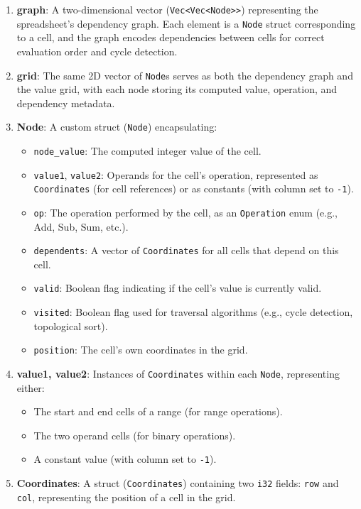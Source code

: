 \documentclass{article}
\begin{document}
\begin{enumerate}
\item \textbf{graph}: A two-dimensional vector (\texttt{Vec<Vec<Node>>}) representing the spreadsheet's dependency graph. Each element is a \texttt{Node} struct corresponding to a cell, and the graph encodes dependencies between cells for correct evaluation order and cycle detection.
\item \textbf{grid}: The same 2D vector of \texttt{Node}s serves as both the dependency graph and the value grid, with each node storing its computed value, operation, and dependency metadata.
\item \textbf{Node}: A custom struct (\texttt{Node}) encapsulating:
\begin{itemize}
\item \texttt{node\_value}: The computed integer value of the cell.
\item \texttt{value1}, \texttt{value2}: Operands for the cell's operation, represented as \texttt{Coordinates} (for cell references) or as constants (with column set to \texttt{-1}).
\item \texttt{op}: The operation performed by the cell, as an \texttt{Operation} enum (e.g., Add, Sub, Sum, etc.).
\item \texttt{dependents}: A vector of \texttt{Coordinates} for all cells that depend on this cell.
\item \texttt{valid}: Boolean flag indicating if the cell's value is currently valid.
\item \texttt{visited}: Boolean flag used for traversal algorithms (e.g., cycle detection, topological sort).
\item \texttt{position}: The cell's own coordinates in the grid.
\end{itemize}
\item \textbf{value1, value2}: Instances of \texttt{Coordinates} within each \texttt{Node}, representing either:
\begin{itemize}
\item The start and end cells of a range (for range operations).
\item The two operand cells (for binary operations).
\item A constant value (with column set to \texttt{-1}).
\end{itemize}
\item \textbf{Coordinates}: A struct (\texttt{Coordinates}) containing two \texttt{i32} fields: \texttt{row} and \texttt{col}, representing the position of a cell in the grid.

\end{enumerate}
\end{document}
